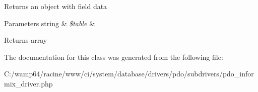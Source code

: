Returns an object with field data


\begin{DoxyParams}[1]{Parameters}
string & {\em \$table} & \\
\hline
\end{DoxyParams}
\begin{DoxyReturn}{Returns}
array 
\end{DoxyReturn}


The documentation for this class was generated from the following file\+:\begin{DoxyCompactItemize}
\item 
C\+:/wamp64/racine/www/ci/system/database/drivers/pdo/subdrivers/pdo\+\_\+informix\+\_\+driver.\+php\end{DoxyCompactItemize}
